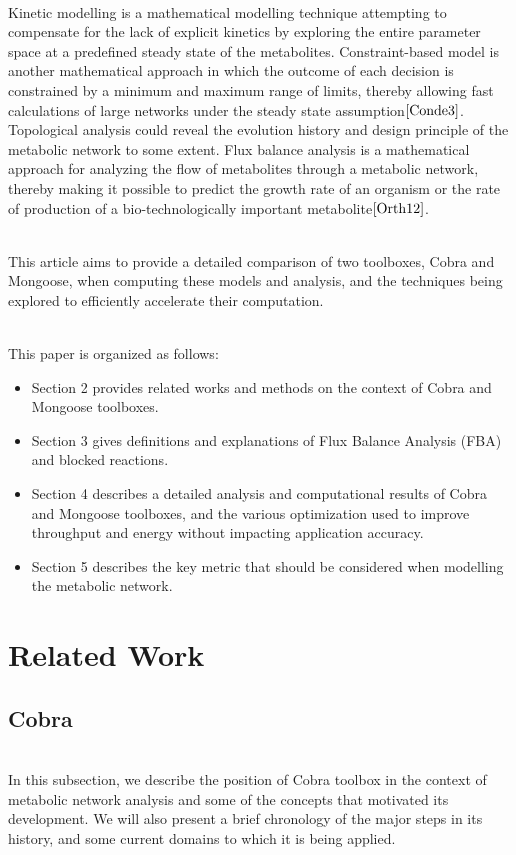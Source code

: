 \documentclass[11pt, a4paper]{article}
\begin{document}
	~\\Kinetic modelling is a mathematical modelling technique attempting to compensate for the lack of explicit kinetics by exploring the entire parameter space at a predefined steady state of the metabolites. Constraint-based model is another mathematical approach in which the outcome of each decision is constrained by a minimum and maximum range of limits, thereby allowing fast calculations of large networks under the steady state assumption$\cite{Conde3}$. Topological analysis could reveal the evolution history and design principle of the metabolic network to some extent. Flux balance analysis is a mathematical approach for analyzing the flow of metabolites through a metabolic network, thereby making it possible to predict the growth rate of an organism or the rate of production of a bio-technologically important metabolite$\cite{Orth12}$.

	~\\This article aims to provide a detailed comparison of two toolboxes, Cobra and Mongoose, when computing these models and analysis, and the techniques being explored to efficiently accelerate their computation.

	~\\This paper is organized as follows:
	\begin{itemize}
	    \item Section 2 provides related works and methods on the context of Cobra and Mongoose toolboxes.
	    \item Section 3 gives definitions and explanations of Flux Balance Analysis (FBA) and blocked reactions.
	    \item Section 4 describes a detailed analysis and computational results of Cobra and Mongoose toolboxes, and the various optimization used to improve throughput and energy without impacting application accuracy.
	    \item Section 5 describes the key metric that should be considered when modelling the metabolic network.
	\end{itemize}
	\newpage
	\section{Related Work}
	\subsection{Cobra}
	~\\In this subsection, we describe the position of Cobra toolbox in the context of metabolic network analysis and some of the concepts that motivated its development. We will also present a brief chronology of the major steps in its history, and some current domains to which it is being applied.
\end{document}
